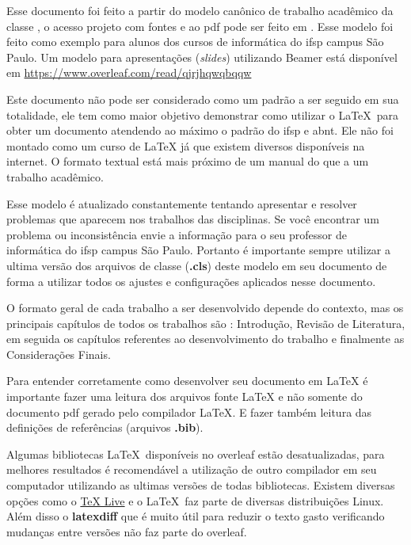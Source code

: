 

Esse documento foi feito a partir do modelo canônico de trabalho acadêmico da classe \abnTeX, o acesso projeto com fontes e ao \acs{pdf} pode ser feito em 
\urlmodelo. Esse modelo foi feito como exemplo para alunos dos cursos de informática do \ac{ifsp} campus São Paulo. Um modelo para apresentações (\textit{slides}) utilizando Beamer está disponível em  \url{https://www.overleaf.com/read/qjrjhqwqbqqw}


Este documento não pode ser considerado como um padrão a ser seguido em sua totalidade, ele tem como maior objetivo demonstrar como utilizar o \LaTeX\ para obter um documento atendendo ao máximo o padrão do \ac{ifsp} e \ac{abnt}. Ele não foi montado como um curso de {\LaTeX} já que existem diversos disponíveis na internet. O formato textual está mais próximo de um manual do que a um trabalho acadêmico.

Esse modelo é atualizado constantemente tentando apresentar e resolver problemas que aparecem nos trabalhos das disciplinas. Se você encontrar um problema ou inconsistência envie a informação para o seu professor de informática do \ac{ifsp} campus São Paulo. Portanto é importante sempre utilizar a ultima versão dos arquivos de classe (\textbf{.cls}) deste modelo em seu documento de forma a utilizar todos os ajustes e configurações aplicados nesse documento.

O formato geral de cada trabalho a ser desenvolvido depende do contexto, mas os principais capítulos de todos os trabalhos são : Introdução, Revisão de Literatura, em seguida os capítulos referentes ao desenvolvimento do trabalho e finalmente as Considerações Finais.

Para entender corretamente como desenvolver seu documento em {\LaTeX} é importante fazer uma leitura dos arquivos fonte {\LaTeX} e não somente do documento \acs{pdf} gerado pelo compilador {\LaTeX}. E fazer também leitura das definições de referências (arquivos \textbf{.bib}).

Algumas bibliotecas \LaTeX\ disponíveis no overleaf estão desatualizadas, para melhores resultados é recomendável a utilização de outro compilador em seu computador utilizando as ultimas versões de todas bibliotecas. Existem diversas opções como o \href{https://www.tug.org/texlive/}{TeX Live}  e o \LaTeX\ faz parte de diversas distribuições Linux. Além disso o \textbf{latexdiff} que é muito útil para reduzir o texto gasto verificando mudanças entre versões não faz parte do overleaf.

